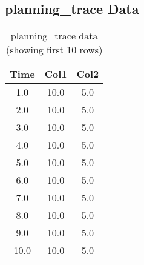 \documentclass{article}
\begin{document}
\subsection{planning_trace Data}
\begin{table}[h]
\centering
\begin{tabular}{ccc}
\toprule
Time & Col1 & Col2 \\
\midrule
1.0 & 10.0 & 5.0 \\
2.0 & 10.0 & 5.0 \\
3.0 & 10.0 & 5.0 \\
4.0 & 10.0 & 5.0 \\
5.0 & 10.0 & 5.0 \\
6.0 & 10.0 & 5.0 \\
7.0 & 10.0 & 5.0 \\
8.0 & 10.0 & 5.0 \\
9.0 & 10.0 & 5.0 \\
10.0 & 10.0 & 5.0 \\
\bottomrule
\end{tabular}
\caption{planning_trace data (showing first 10 rows)}
\end{table}
\end{document}
